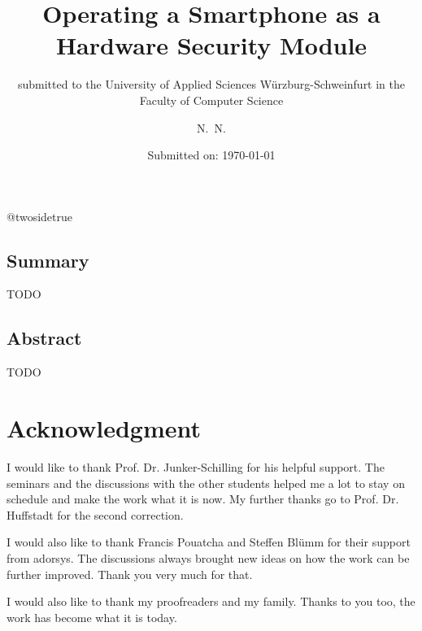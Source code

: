 \documentclass[12pt,oneside,a4paper,parskip]{scrbook}
\makeatletter
\def\BaAuthor{Achim Winter}
\def\BaAuthorStudyProgram{Computer Science}
\def\BaType{Bachelor thesis} %
\def\BaTitle{Operating a Smartphone as a Hardware Security Module}
\def\BaSupervisorOne{Prof.\ Dr.\ Junker-Schilling}
\def\BaSupervisorTwo{Prof.\ Dr.\ Huffstadt}
\def\BaDeadline{\today}
\def\ShowBaAuthor{\BaAuthor}
\def\ShowBaAuthor{N.~N.}
\newcommand*{\forcetwosidetitle}[1][1]{%
 \begingroup
   \cleardoubleoddpage
   \KOMAoptions{titlepage=true}%
   \csname @twosidetrue\endcsname
   \maketitle[{#1}]
 \endgroup
}
\makeatother
\begin{document}


\frontmatter
\titlehead{%
  {University of applied Sciences W\"{u}rzburg-Schweinfurt\\
   Faculty of Computer Science and Business Informatics}}
\subject{\BaType}
\title{\BaTitle\\[15mm]}
\subtitle{\normalsize{submitted to the University of Applied Sciences W\"{u}rzburg-Schweinfurt in the Faculty of \BaAuthorStudyProgram}}
\author{\ShowBaAuthor}
\date{\normalsize{Submitted on: \BaDeadline}}
\publishers{
  \normalsize{First Supervisor: \BaSupervisorOne}\\
  \normalsize{Second Supervisor: \BaSupervisorTwo}\\
}

\forcetwosidetitle



\section*{Summary}
TODO

\section*{Abstract}

TODO

\newpage
\chapter*{Acknowledgment}

I would like to thank Prof. Dr. Junker-Schilling for his helpful support. The seminars and the discussions with the other students helped me a lot to stay on schedule and make the work what it is now. My further thanks go to Prof. Dr. Huffstadt for the second correction. 

I would also like to thank Francis Pouatcha and Steffen Blümm for their support from adorsys. The discussions always brought new ideas on how the work can be further improved. Thank you very much for that.

I would also like to thank my proofreaders and my family. Thanks to you too, the work has become what it is today.

\tableofcontents
\end{document}
